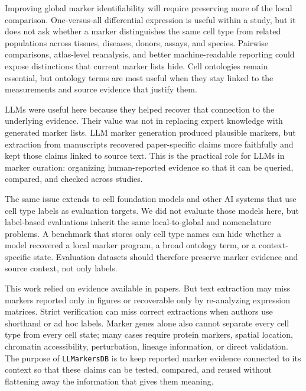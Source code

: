 \documentclass[10pt,twocolumn]{article}
\theoremstyle{plain}
\theoremstyle{definition}
\theoremstyle{remark}
\begin{document}
Improving global marker identifiability will require preserving more of the local comparison. One-versus-all differential expression is useful within a study, but it does not ask whether a marker distinguishes the same cell type from related populations across tissues, diseases, donors, assays, and species. Pairwise comparisons, atlas-level reanalysis, and better machine-readable reporting could expose distinctions that current marker lists hide. Cell ontologies remain essential, but ontology terms are most useful when they stay linked to the measurements and source evidence that justify them.

LLMs were useful here because they helped recover that connection to the underlying evidence. Their value was not in replacing expert knowledge with generated marker lists. LLM marker generation produced plausible markers, but extraction from manuscripts recovered paper-specific claims more faithfully and kept those claims linked to source text. This is the practical role for LLMs in marker curation: organizing human-reported evidence so that it can be queried, compared, and checked across studies.

The same issue extends to cell foundation models and other AI systems that use cell type labels as evaluation targets. We did not evaluate those models here, but label-based evaluations inherit the same local-to-global and nomenclature problems. A benchmark that stores only cell type names can hide whether a model recovered a local marker program, a broad ontology term, or a context-specific state. Evaluation datasets should therefore preserve marker evidence and source context, not only labels.

This work relied on evidence available in papers. But text extraction may miss markers reported only in figures or recoverable only by re-analyzing expression matrices. Strict verification can miss correct extractions when authors use shorthand or ad hoc labels. Marker genes alone also cannot separate every cell type from every cell state; many cases require protein markers, spatial location, chromatin accessibility, perturbation, lineage information, or direct validation. The purpose of \texttt{LLMarkersDB} is to keep reported marker evidence connected to its context so that these claims can be tested, compared, and reused without flattening away the information that gives them meaning.

\clearpage
\newpage
\onecolumn
\appendix
\setcounter{figure}{0}
\setcounter{table}{0}
\renewcommand{\thefigure}{S\arabic{figure}}
\renewcommand{\thetable}{S\arabic{table}}
\end{document}
